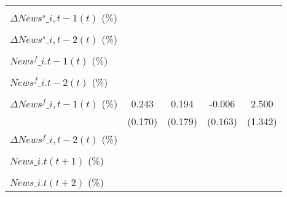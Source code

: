 {\begin{tabular}{l*{4}{c}}
                    &                     &                     &                     &                     \\
\addlinespace
$ \Delta News^s\_{i,t-1}(t)$ (\%)&                     &                     &                     &                     \\
                    &                     &                     &                     &                     \\
\addlinespace
$ \Delta News^s\_{i,t-2}(t)$ (\%)&                     &                     &                     &                     \\
                    &                     &                     &                     &                     \\
\addlinespace
$ News^f\_{i.t-1}(t)$ (\%)&                     &                     &                     &                     \\
                    &                     &                     &                     &                     \\
\addlinespace
$ News^f\_{i.t-2}(t)$ (\%)&                     &                     &                     &                     \\
                    &                     &                     &                     &                     \\
\addlinespace
$ \Delta News^f\_{i,t-1}(t)$ (\%)&       0.243         &       0.194         &      -0.006         &       2.500\sym{*}  \\
                    &     (0.170)         &     (0.179)         &     (0.163)         &     (1.342)         \\
\addlinespace
$ \Delta News^f\_{i,t-2}(t)$ (\%)&                     &                     &                     &                     \\
                    &                     &                     &                     &                     \\
\addlinespace
$ News\_{i.t}(t+1)$ (\%)&                     &                     &                     &                     \\
                    &                     &                     &                     &                     \\
\addlinespace
$ News\_{i.t}(t+2)$ (\%)&                     &                     &                     &                     \\

\end{tabular}}
